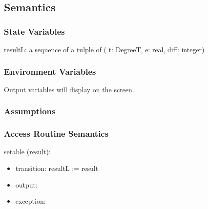 \documentclass[12pt, titlepage]{article}
\begin{document}
\subsection{Semantics}

\subsubsection{State Variables}

resultL: a sequence of a tulple of ( t: DegreeT, e: real, diff: integer)\\

\subsubsection{Environment Variables}
Output variables will display on the screen. 

\subsubsection{Assumptions}


\subsubsection{ Access Routine Semantics}

\noindent  setable (result):
\begin{itemize}
\item transition: resultL := result
\item output:
\item exception: 
\end{itemize}
\end{document}

